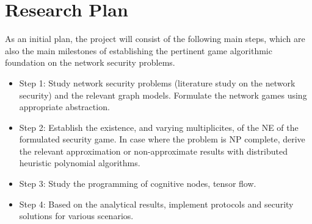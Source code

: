 \documentclass[10pt]{article}
\theoremstyle{definition}
\begin{document}
\section{Research Plan}


As an initial plan, the project will consist of the following main steps, which are also the main milestones of establishing the pertinent game algorithmic foundation on the network security problems.
\begin{itemize}
	\item Step 1: Study network security problems (literature study on the
    network security) and the relevant graph models. Formulate the network games using appropriate abstraction.
	\item Step 2: Establish the existence, and varying multiplicites, of the NE of the formulated security game. In case where the problem is NP complete, derive the relevant approximation or non-approximate results with distributed heuristic polynomial algorithms.
	\item Step 3: Study the programming of cognitive nodes, tensor flow.
	\item Step 4: Based on the analytical results, implement protocols and security solutions for various scenarios.
\end{itemize}
\end{document}
